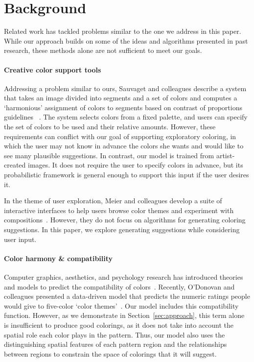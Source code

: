 \section{Background}
\label{sec:background}

Related work has tackled problems similar to the one we address in this paper. While our approach builds on some of the ideas and algorithms presented in past research, these methods alone are not sufficient to meet our goals.

\paragraph{Creative color support tools}
Addressing a problem similar to ours, Sauvaget and colleagues describe a system that takes an image divided into segments and a set of colors and computes a `harmonious' assignment of colors to segments based on contrast of proportions guidelines ~. The system selects colors from a fixed palette, and users can specify the set of colors to be used and their relative amounts. However, these requirements can conflict with our goal of supporting exploratory coloring, in which the user may not know in advance the colors she wants and would like to see many plausible suggestions. In contrast, our model is trained from artist-created images. It does not require the user to specify colors in advance, but its probabilistic framework is general enough to support this input if the user desires it.

In the theme of user exploration, Meier and colleagues develop a suite of interactive interfaces to help users browse color themes and experiment with compositions~. However, they do not focus on algorithms for generating coloring suggestions. In this paper, we explore generating suggestions while considering user input.

\paragraph{Color harmony \& compatibility}
Computer graphics, aesthetics, and psychology research has introduced theories and models to predict the compatibility of colors~\cite{CohenOrHarmonization,Munsell,PalmerColorPreference,Itten}. Recently, O'Donovan and colleagues presented a data-driven model that predicts the numeric ratings people would give to five-color `color themes'~.
Our model includes this compatibility function. However, as we demonstrate in Section~\ref{sec:approach}, this term alone is insufficient to produce good colorings, as it does not take into account the spatial role each color plays in the pattern. Thus, our model also uses the distinguishing spatial features of each pattern region and the relationships between regions to constrain the space of colorings that it will suggest.

